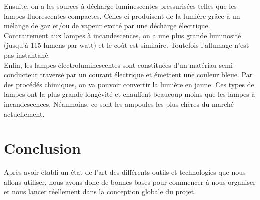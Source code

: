 Ensuite, on a les sources à décharge luminescentes pressurisées telles que les lampes fluorescentes compactes. Celles-ci produisent de la lumière grâce à un mélange de gaz et/ou de vapeur excité par une décharge électrique. Contrairement aux lampes à incandescences, on a une plus grande luminosité (jusqu'à 115 lumens par watt) et le coût est similaire. Toutefois l'allumage n'est pas instantané.\\
		
Enfin, les lampes électroluminescentes sont constituées d'un matériau semi-conducteur traversé par un courant électrique et émettent une couleur bleue. Par des procédés chimiques, on va pouvoir convertir la lumière en jaune. Ces types de lampes ont la plus grande longévité et chauffent beaucoup moins que les lampes à incandescences. Néanmoins, ce sont les ampoules les plus chères du marché actuellement. \\

\section*{Conclusion} %
\label{sec:conclusion}
	Après avoir établi un état de l'art des différents outils et technologies que nous allons utiliser, nous avons donc de bonnes bases pour commencer à nous organiser et nous lancer réellement dans la conception globale du projet.
